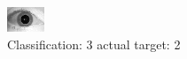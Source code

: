 \begin{figure}[h!]
\begin{center}
\includegraphics[width=0.60\columnwidth]{figures/ID1720_class_3_target_2.png}
\end{center}
\caption{ Classification: 3 actual target: 2}
\label{fig:ID1720_class_3_target_2}
\end{figure}
